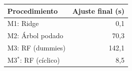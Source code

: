 \begin{tabular}{lr}
\toprule
Procedimiento & Ajuste final (s) \\
\midrule
M1: Ridge & 0{,}1 \\
M2: Árbol podado & 70{,}3 \\
M3: RF (dummies) & 142{,}1 \\
M3$^\ast$: RF (cíclico) & 8{,}5 \\
\bottomrule
\end{tabular}